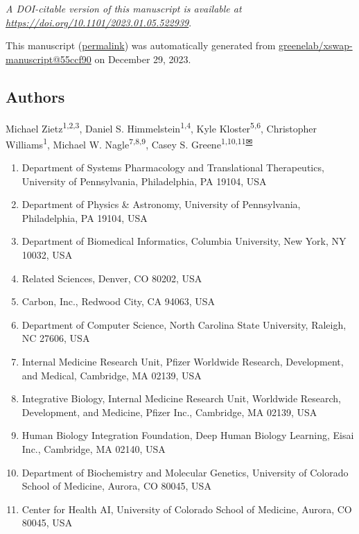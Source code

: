 \emph{A DOI-citable version of this manuscript is available at \url{https://doi.org/10.1101/2023.01.05.522939}}.

This manuscript
(\href{https://greenelab.github.io/xswap-manuscript/v/55ccf900e5d69b9defd93e7b4341ae2cf3612720/}{permalink})
was automatically generated
from \href{https://github.com/greenelab/xswap-manuscript/tree/55ccf900e5d69b9defd93e7b4341ae2cf3612720}{greenelab/xswap-manuscript@55ccf90}
on December 29, 2023.

\hypertarget{authors}{%
\subsection{Authors}\label{authors}}

Michael Zietz\textsuperscript{1,2,3},
Daniel S. Himmelstein\textsuperscript{1,4},
Kyle Kloster\textsuperscript{5,6},
Christopher Williams\textsuperscript{1},
Michael W. Nagle\textsuperscript{7,8,9},
Casey S. Greene\textsuperscript{1,10,11\protect\hyperlink{corresponding}{✉}}

\begin{enumerate}
\def\labelenumi{\arabic{enumi}.}
\tightlist
\item
  Department of Systems Pharmacology and Translational Therapeutics, University of Pennsylvania, Philadelphia, PA 19104, USA
\item
  Department of Physics \& Astronomy, University of Pennsylvania, Philadelphia, PA 19104, USA
\item
  Department of Biomedical Informatics, Columbia University, New York, NY 10032, USA
\item
  Related Sciences, Denver, CO 80202, USA
\item
  Carbon, Inc., Redwood City, CA 94063, USA
\item
  Department of Computer Science, North Carolina State University, Raleigh, NC 27606, USA
\item
  Internal Medicine Research Unit, Pfizer Worldwide Research, Development, and Medical, Cambridge, MA 02139, USA
\item
  Integrative Biology, Internal Medicine Research Unit, Worldwide Research, Development, and Medicine, Pfizer Inc., Cambridge, MA 02139, USA
\item
  Human Biology Integration Foundation, Deep Human Biology Learning, Eisai Inc., Cambridge, MA 02140, USA
\item
  Department of Biochemistry and Molecular Genetics, University of Colorado School of Medicine, Aurora, CO 80045, USA
\item
  Center for Health AI, University of Colorado School of Medicine, Aurora, CO 80045, USA
\end{enumerate}

